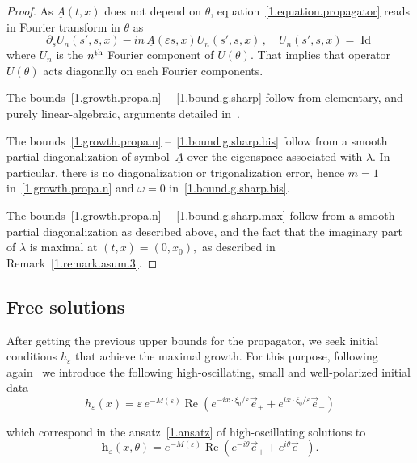 \documentclass[AHL,Unicode,longabstracts,published]{cedram}
\theoremstyle{plain}
\newcommand*\e{\varepsilon}
\newcommand{\dptl}{\partial}%
\newcommand*\h{{\mathbf h}}
\newcommand*\und{\underline}
\DeclareMathOperator{\Id}{Id}
\DeclareMathOperator{\Ret}{Re}
\begin{document}
\begin{proof}
As $\und{A}(t,x)$ does not depend on $\theta$, equation~\eqref{1.equation.propagator} reads in Fourier transform in $\theta$ as
\[
\dptl_{s}U_n(s',s,x) - in\,\und{A}(\e s, x) U_n(s',s,x)\,, \quad U_n(s',s,x) = {\Id}
\]
where $U_n$ is the $n^{\rm th}$ Fourier component of $U(\theta)$. That implies that operator $U(\theta)$ acts diagonally on each Fourier components.

The bounds~\eqref{1.growth.propa.n} --~\eqref{1.bound.g.sharp} follow from elementary, and purely linear-algebraic, arguments detailed in~\cite[Sections~(4.2) and (4.3)]{lerner2015onset}.

The bounds~\eqref{1.growth.propa.n} --~\eqref{1.bound.g.sharp.bis} follow from a smooth partial diagonalization of symbol~$\und{A}$ over the eigenspace associated with $\lambda$. In particular, there is no diagonalization or trigonalization error, hence $m = 1$ in~\eqref{1.growth.propa.n} and $\omega = 0$ in~\eqref{1.bound.g.sharp.bis}.

The bounds~\eqref{1.growth.propa.n} --~\eqref{1.bound.g.sharp.max} follow from a smooth partial diagonalization as described above, and the fact that the imaginary part of $\lambda$ is maximal at $(t,x) = (0,x_0),$ as described in Remark~\ref{1.remark.asum.3}.
\end{proof}



\subsection{Free solutions}\label{1.subsection.free.solution}



After getting the previous upper bounds for the propagator, we seek initial conditions $h_{\e}$ that achieve the maximal growth. For this purpose, following again~\cite{metivier2005remarks} we introduce the following high-oscillating, small and well-polarized initial data
\begin{equation}\label{1.def.initial.data}
h_{\e}(x) = \e\,e^{-M(\e)} {\Ret}\left(e^{-ix\cdot\xi_0/\e} \vec{e}_{+} + e^{ix\cdot\xi_0/\e} \vec{e}_{-}\right)
\end{equation}

\noindent which correspond in the ansatz~\eqref{1.ansatz} of high-oscillating solutions to
\begin{equation}\label{1.def.initial.data.ansatz}
\h_{\e}(x,\theta) = e^{-M(\e)} {\Ret}\left(e^{-i\theta} \vec{e}_{+} + e^{i\theta} \vec{e}_{-}\right).
\end{equation}
\end{document}

